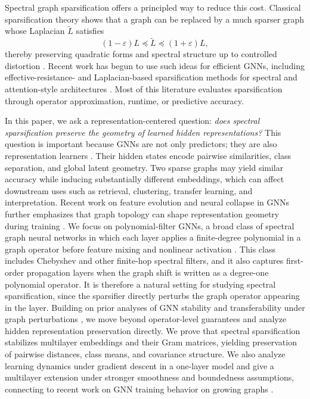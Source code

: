 \documentclass{article}
\begin{document}
Spectral graph sparsification offers a principled way to reduce this cost. Classical sparsification theory shows that a graph can be replaced by a much sparser graph whose Laplacian $\widetilde L$ satisfies
\[
(1-\varepsilon)L \preceq \widetilde L \preceq (1+\varepsilon)L,
\]
thereby preserving quadratic forms and spectral structure up to controlled distortion
\citep{spielman2011graph}. Recent work has begun to use such ideas for efficient GNNs, including effective-resistance- and Laplacian-based sparsification methods for spectral and attention-style architectures
\citep{ding2025largescale}. Most of this literature evaluates sparsification through operator approximation, runtime, or predictive accuracy.

In this paper, we ask a representation-centered question: \emph{does spectral sparsification preserve the geometry of learned hidden representations?} This question is important because GNNs are not only predictors; they are also representation learners
\citep{hamilton2017representation}. Their hidden states encode pairwise similarities, class separation, and global latent geometry. Two sparse graphs may yield similar accuracy while inducing substantially different embeddings, which can affect downstream uses such as retrieval, clustering, transfer learning, and interpretation. Recent work on feature evolution and neural collapse in GNNs further emphasizes that graph topology can shape representation geometry during training
\citep{kothapalli2023neuralcollapsegnn,papyan2020neuralcollapse}.
We focus on polynomial-filter GNNs, a broad class of spectral graph neural networks in which each layer applies a finite-degree polynomial in a graph operator before feature mixing and nonlinear activation \citep{defferrard2016cnn}. This class includes Chebyshev and other finite-hop spectral filters, and it also captures first-order propagation layers when the graph shift is written as a degree-one polynomial operator. It is therefore a natural setting for studying spectral sparsification, since the sparsifier directly perturbs the graph operator appearing in the layer.
Building on prior analyses of GNN stability and transferability under graph perturbations \citep{gama2020stability,ruiz2021gnnprocieee,ruiz2023transferability}, we move beyond operator-level guarantees and analyze hidden representation preservation directly. We prove that spectral sparsification stabilizes multilayer embeddings and their Gram matrices, yielding preservation of pairwise distances, class means, and covariance structure. We also analyze learning dynamics under gradient descent in a one-layer model and give a multilayer extension under stronger smoothness and boundedness assumptions, connecting to recent work on GNN training behavior on growing graphs \citep{krishnagopal2023gntk}.
\end{document}

